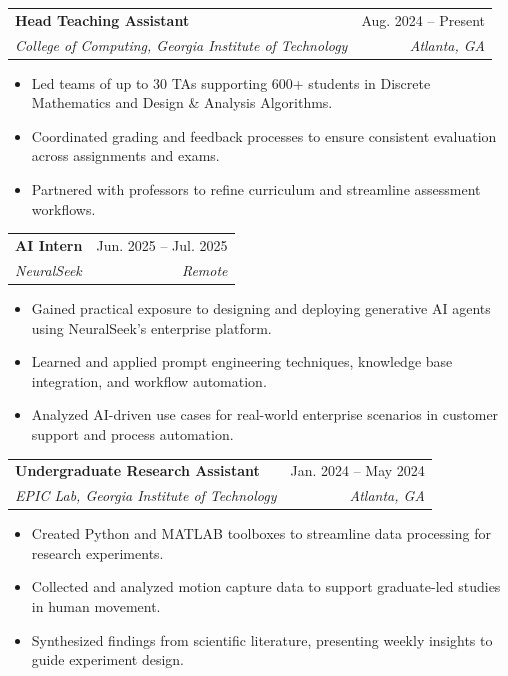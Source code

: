 \documentclass[letterpaper,11pt]{article}
\makeatletter
\newcommand{\resumeItem}[1]{
  \item\small{
    {#1 \vspace{-2pt}}
  }
}
\newcommand{\resumeSubheading}[4]{
  \vspace{-2pt}\item
    \begin{tabular*}{0.97\textwidth}[t]{l@{\extracolsep{\fill}}r}
      \textbf{\small#1} & \small #2 \\
      \textit{\small#3} & \textit{\small #4} \\
    \end{tabular*}\vspace{-5pt}
}
\newcommand{\resumeSubSubheading}[2]{
    \item
    \begin{tabular*}{0.97\textwidth}{l@{\extracolsep{\fill}}r}
      \textit{\small#1} & \textit{\small #2} \\
    \end{tabular*}\vspace{-5pt}
}
\newcommand{\resumeSubHeadingListEnd}{\end{itemize}}
\newcommand{\resumeItemListStart}{\begin{itemize}}
\newcommand{\resumeItemListEnd}{\end{itemize}\vspace{-5pt}}
\makeatother
\begin{document}
    \resumeSubheading
      {Head Teaching Assistant}{Aug. 2024 -- Present}
      {College of Computing, Georgia Institute of Technology}{Atlanta, GA}
      \resumeItemListStart
        \resumeItem{Led teams of up to 30 TAs supporting 600+ students in Discrete Mathematics and Design \& Analysis Algorithms.}
        \resumeItem{Coordinated grading and feedback processes to ensure consistent evaluation across assignments and exams.}
        \resumeItem{Partnered with professors to refine curriculum and streamline assessment workflows.}
      \resumeItemListEnd

      \resumeSubheading
      {AI Intern}{Jun. 2025 -- Jul. 2025}
      {NeuralSeek}{Remote}
      \resumeItemListStart
        \resumeItem{Gained practical exposure to designing and deploying generative AI agents using NeuralSeek’s enterprise platform.}
        \resumeItem{Learned and applied prompt engineering techniques, knowledge base integration, and workflow automation.}
        \resumeItem{Analyzed AI-driven use cases for real-world enterprise scenarios in customer support and process automation.}

      \resumeItemListEnd
      

    \resumeSubheading
      {Undergraduate Research Assistant}{Jan. 2024 -- May 2024}
      {EPIC Lab, Georgia Institute of Technology}{Atlanta, GA}
      \resumeItemListStart
        \resumeItem{Created Python and MATLAB toolboxes to streamline data processing for research experiments.}
        \resumeItem{Collected and analyzed motion capture data to support graduate-led studies in human movement.}
        \resumeItem{Synthesized findings from scientific literature, presenting weekly insights to guide experiment design.}
    \resumeItemListEnd
\end{document}
